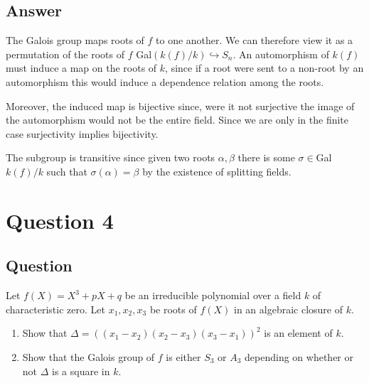 \documentclass[11pt]{article}
\begin{document}
\subsection{Answer}

The Galois group maps roots of $f$ to one another. We can therefore view it as a permutation of the roots of $f$ Gal$(k(f)/k) \hookrightarrow S_n$. An automorphism of $k(f)$ must induce a map on the roots of $k$, since if a root were sent to a  non-root by an automorphism this would induce a dependence relation among the roots. 

Moreover, the induced map is bijective since, were it not surjective the image of the automorphism would not be the entire field. Since we are only in the finite case surjectivity implies bijectivity.

The subgroup is transitive since given two roots $\alpha, \beta$ there is some $\sigma \in $Gal$k(f)/k$ such that $\sigma(\alpha) = \beta$ by the existence of splitting fields.

\section{Question 4}
\subsection{Question}
Let $f(X)=X^3+pX+q$ be an irreducible polynomial over a field $k$ of characteristic zero. Let $x_1, x_2, x_3$ be roots of $f(X)$ in an algebraic closure of $k$.
\begin{enumerate}
\item Show that $\Delta = ((x_1-x_2)(x_2-x_3)(x_3-x_1))^2$ is an element of $k$.
\item Show that the Galois group of $f$ is either $S_3$ or $A_3$ depending on whether or not $\Delta$ is a square in $k$.
\end{enumerate}
\end{document}
